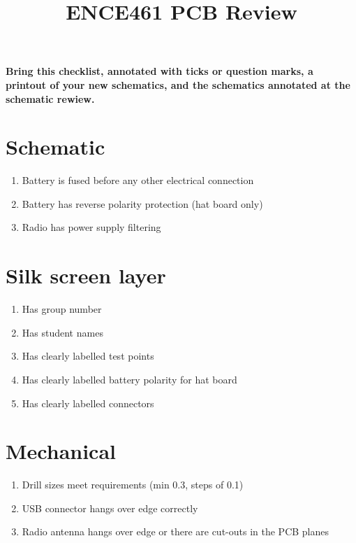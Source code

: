 \documentclass[a4paper, 12pt]{article}
\title{ENCE461 PCB Review}
\author{}
\date{}
\begin{document}
\maketitle


\begin{center}
  \textbf{Bring this checklist, annotated with ticks or question
    marks, a printout of your new schematics, and the schematics
    annotated at the schematic rewiew.}
\end{center}


\section*{Schematic}

\begin{enumerate}
\item Battery is fused before any other electrical connection

\item Battery has reverse polarity protection (hat board only)

\item Radio has power supply filtering
\end{enumerate}


\section*{Silk screen layer}

\begin{enumerate}
\item Has group number

\item Has student names

\item Has clearly labelled test points

\item Has clearly labelled battery polarity for hat board

\item Has clearly labelled connectors

\end{enumerate}


\section*{Mechanical}

\begin{enumerate}
\item Drill sizes meet requirements (min 0.3, steps of 0.1)

\item USB connector hangs over edge correctly

\item Radio antenna hangs over edge or there are cut-outs in the PCB planes
\end{enumerate}
\end{document}
